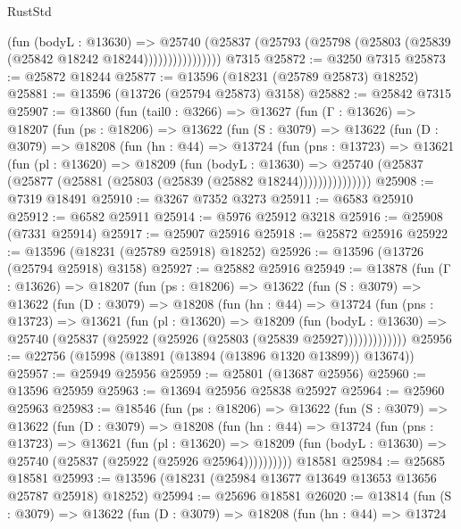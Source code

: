 \begin{lexlean}{RustStd}
\begin{coremodule}
                      (fun (bodyL : @13630) =>
                      @25740
                        (@25837
                          (@25793 (@25798 (@25803 (@25839 (@25842 @18242 @18244))))))))))))))))
    @7315
@25872 := @3250 @7315
@25873 := @25872 @18244
@25877 := @13596 (@18231 (@25789 @25873) @18252)
@25881 := @13596 (@13726 (@25794 @25873) @3158)
@25882 := @25842 @7315
@25907 := @13860
    (fun (tail0 : @3266) =>
    @13627
      (fun (Γ : @13626) =>
      @18207
        (fun (ps : @18206) =>
        @13622
          (fun (S : @3079) =>
          @13622
            (fun (D : @3079) =>
            @18208
              (fun (hn : @44) =>
              @13724
                (fun (pns : @13723) =>
                @13621
                  (fun (pl : @13620) =>
                  @18209
                    (fun (bodyL : @13630) =>
                    @25740 (@25837 (@25877 (@25881 (@25803 (@25839 (@25882 @18244)))))))))))))))
@25908 := @7319 @18491
@25910 := @3267 @7352 @3273
@25911 := @6583 @25910
@25912 := @6582 @25911
@25914 := @5976 @25912 @3218
@25916 := @25908 (@7331 @25914)
@25917 := @25907 @25916
@25918 := @25872 @25916
@25922 := @13596 (@18231 (@25789 @25918) @18252)
@25926 := @13596 (@13726 (@25794 @25918) @3158)
@25927 := @25882 @25916
@25949 := @13878
    (fun (Γ : @13626) =>
    @18207
      (fun (ps : @18206) =>
      @13622
        (fun (S : @3079) =>
        @13622
          (fun (D : @3079) =>
          @18208
            (fun (hn : @44) =>
            @13724
              (fun (pns : @13723) =>
              @13621
                (fun (pl : @13620) =>
                @18209
                  (fun (bodyL : @13630) =>
                  @25740 (@25837 (@25922 (@25926 (@25803 (@25839 @25927)))))))))))))
@25956 := @22756 (@15998 (@13891 (@13894 (@13896 @1320 @13899)) @13674))
@25957 := @25949 @25956
@25959 := @25801 (@13687 @25956)
@25960 := @13596 @25959
@25963 := @13694 @25956 @25838 @25927
@25964 := @25960 @25963
@25983 := @18546
    (fun (ps : @18206) =>
    @13622
      (fun (S : @3079) =>
      @13622
        (fun (D : @3079) =>
        @18208
          (fun (hn : @44) =>
          @13724
            (fun (pns : @13723) =>
            @13621
              (fun (pl : @13620) =>
              @18209 (fun (bodyL : @13630) => @25740 (@25837 (@25922 (@25926 @25964))))))))))
    @18581
@25984 := @25685 @18581
@25993 := @13596 (@18231 (@25984 @13677 @13649 @13653 @13656 @25787 @25918) @18252)
@25994 := @25696 @18581
@26020 := @13814
    (fun (S : @3079) =>
    @13622
      (fun (D : @3079) =>
      @18208
        (fun (hn : @44) =>
        @13724

\end{coremodule}
\end{lexlean}
